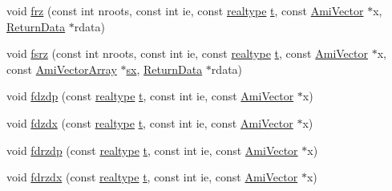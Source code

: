 \begin{DoxyCompactItemize}
\item 
void \mbox{\hyperlink{classamici_1_1_model_a8a033ace9618ccc4c72d2956f0bf79ac}{frz}} (const int nroots, const int ie, const \mbox{\hyperlink{namespaceamici_a1bdce28051d6a53868f7ccbf5f2c14a3}{realtype}} \mbox{\hyperlink{classamici_1_1_model_a711281d57e9710226face29151cc4641}{t}}, const \mbox{\hyperlink{classamici_1_1_ami_vector}{Ami\+Vector}} $\ast$x, \mbox{\hyperlink{classamici_1_1_return_data}{Return\+Data}} $\ast$rdata)
\item 
void \mbox{\hyperlink{classamici_1_1_model_a5ddd801e9951f8057c2cfd8c66a27c42}{fsrz}} (const int nroots, const int ie, const \mbox{\hyperlink{namespaceamici_a1bdce28051d6a53868f7ccbf5f2c14a3}{realtype}} \mbox{\hyperlink{classamici_1_1_model_a711281d57e9710226face29151cc4641}{t}}, const \mbox{\hyperlink{classamici_1_1_ami_vector}{Ami\+Vector}} $\ast$x, const \mbox{\hyperlink{classamici_1_1_ami_vector_array}{Ami\+Vector\+Array}} $\ast$\mbox{\hyperlink{classamici_1_1_model_ac3288cc7f649605938f1fd1b459d3d8c}{sx}}, \mbox{\hyperlink{classamici_1_1_return_data}{Return\+Data}} $\ast$rdata)
\item 
void \mbox{\hyperlink{classamici_1_1_model_a0be0b4d550d53eebd0e35c65f1b1bbc6}{fdzdp}} (const \mbox{\hyperlink{namespaceamici_a1bdce28051d6a53868f7ccbf5f2c14a3}{realtype}} \mbox{\hyperlink{classamici_1_1_model_a711281d57e9710226face29151cc4641}{t}}, const int ie, const \mbox{\hyperlink{classamici_1_1_ami_vector}{Ami\+Vector}} $\ast$x)
\item 
void \mbox{\hyperlink{classamici_1_1_model_add010f6b76558fb38611b5a79612a547}{fdzdx}} (const \mbox{\hyperlink{namespaceamici_a1bdce28051d6a53868f7ccbf5f2c14a3}{realtype}} \mbox{\hyperlink{classamici_1_1_model_a711281d57e9710226face29151cc4641}{t}}, const int ie, const \mbox{\hyperlink{classamici_1_1_ami_vector}{Ami\+Vector}} $\ast$x)
\item 
void \mbox{\hyperlink{classamici_1_1_model_ae7dc86ad0c432396fa21ad0f423c531c}{fdrzdp}} (const \mbox{\hyperlink{namespaceamici_a1bdce28051d6a53868f7ccbf5f2c14a3}{realtype}} \mbox{\hyperlink{classamici_1_1_model_a711281d57e9710226face29151cc4641}{t}}, const int ie, const \mbox{\hyperlink{classamici_1_1_ami_vector}{Ami\+Vector}} $\ast$x)
\item 
void \mbox{\hyperlink{classamici_1_1_model_a2e4c45f13fbdf23c764b353ef336f7a3}{fdrzdx}} (const \mbox{\hyperlink{namespaceamici_a1bdce28051d6a53868f7ccbf5f2c14a3}{realtype}} \mbox{\hyperlink{classamici_1_1_model_a711281d57e9710226face29151cc4641}{t}}, const int ie, const \mbox{\hyperlink{classamici_1_1_ami_vector}{Ami\+Vector}} $\ast$x)

\end{DoxyCompactItemize}
